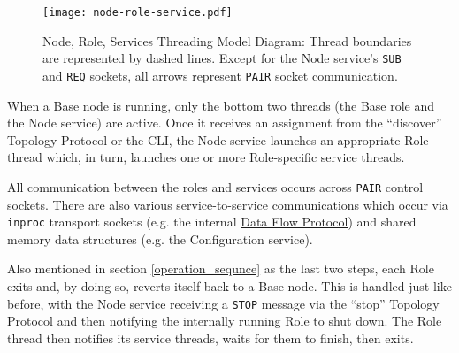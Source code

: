 \begin{figure}[H]
    \centering
    \texttt{[image: node-role-service.pdf]}
    \caption[Node, Role, Services Threading Model Diagram]
            {Node, Role, Services Threading Model Diagram: Thread boundaries are represented by dashed lines. Except for
	     the Node service's \texttt{SUB} and \texttt{REQ} sockets, all arrows represent \texttt{PAIR} socket
	     communication.}
    \label{fig:node_role_service_image}
\end{figure}

When a Base node is running, only the bottom two threads (the Base role and the Node service) are active. Once it
receives an assignment from the ``discover'' Topology Protocol or the \dcamp CLI, the Node service launches an
appropriate Role thread which, in turn, launches one or more Role-specific service threads.

All communication between the roles and services occurs across \texttt{PAIR} control sockets. There are also various
service-to-service communications which occur via \texttt{inproc} transport sockets (e.g. the internal
\hyperref[proto_data]{Data Flow Protocol}) and shared memory data structures (e.g. the Configuration service).

Also mentioned in section \ref{operation_sequnce} as the last two steps, each Role exits and, by doing so, reverts
itself back to a Base node. This is handled just like before, with the Node service receiving a \texttt{STOP} message
via the ``stop'' Topology Protocol and then notifying the internally running Role to shut down. The Role thread then
notifies its service threads, waits for them to finish, then exits.

